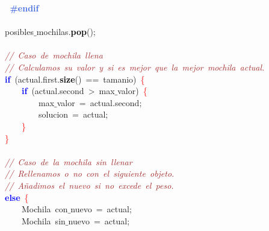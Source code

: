 \mbox{}\textbf{\textcolor{RoyalBlue}{\ \ \ \ \ \ \ \ \#endif}} \\
\mbox{} \\
\mbox{}\ \ \ \ \ \ \ \ posibles$\_$mochilas\textcolor{BrickRed}{.}\textbf{\textcolor{Black}{pop}}\textcolor{BrickRed}{();} \\
\mbox{}\ \ \ \ \ \ \ \  \\
\mbox{}\ \ \ \ \ \ \ \ \textit{\textcolor{Brown}{//\ Caso\ de\ mochila\ llena}} \\
\mbox{}\ \ \ \ \ \ \ \ \textit{\textcolor{Brown}{//\ Calculamos\ su\ valor\ y\ si\ es\ mejor\ que\ la\ mejor\ mochila\ actual.}} \\
\mbox{}\ \ \ \ \ \ \ \ \textbf{\textcolor{Blue}{if}}\ \textcolor{BrickRed}{(}actual\textcolor{BrickRed}{.}first\textcolor{BrickRed}{.}\textbf{\textcolor{Black}{size}}\textcolor{BrickRed}{()}\ \textcolor{BrickRed}{==}\ tamanio\textcolor{BrickRed}{)}\ \textcolor{Red}{\{} \\
\mbox{}\ \ \ \ \ \ \ \ \ \ \ \ \textbf{\textcolor{Blue}{if}}\ \textcolor{BrickRed}{(}actual\textcolor{BrickRed}{.}second\ \textcolor{BrickRed}{\textgreater{}}\ max$\_$valor\textcolor{BrickRed}{)}\ \textcolor{Red}{\{} \\
\mbox{}\ \ \ \ \ \ \ \ \ \ \ \ \ \ \ \ max$\_$valor\ \textcolor{BrickRed}{=}\ actual\textcolor{BrickRed}{.}second\textcolor{BrickRed}{;} \\
\mbox{}\ \ \ \ \ \ \ \ \ \ \ \ \ \ \ \ solucion\ \textcolor{BrickRed}{=}\ actual\textcolor{BrickRed}{;} \\
\mbox{}\ \ \ \ \ \ \ \ \ \ \ \ \textcolor{Red}{\}} \\
\mbox{}\ \ \ \ \ \ \ \ \textcolor{Red}{\}} \\
\mbox{}\ \ \ \ \ \ \ \  \\
\mbox{}\ \ \ \ \ \ \ \ \textit{\textcolor{Brown}{//\ Caso\ de\ la\ mochila\ sin\ llenar}} \\
\mbox{}\ \ \ \ \ \ \ \ \textit{\textcolor{Brown}{//\ Rellenamos\ o\ no\ con\ el\ siguiente\ objeto.}} \\
\mbox{}\ \ \ \ \ \ \ \ \textit{\textcolor{Brown}{//\ Añadimos\ el\ nuevo\ si\ no\ excede\ el\ peso.}} \\
\mbox{}\ \ \ \ \ \ \ \ \textbf{\textcolor{Blue}{else}}\ \textcolor{Red}{\{} \\
\mbox{}\ \ \ \ \ \ \ \ \ \ \ \ \textcolor{TealBlue}{Mochila}\ con$\_$nuevo\ \textcolor{BrickRed}{=}\ actual\textcolor{BrickRed}{;} \\
\mbox{}\ \ \ \ \ \ \ \ \ \ \ \ \textcolor{TealBlue}{Mochila}\ sin$\_$nuevo\ \textcolor{BrickRed}{=}\ actual\textcolor{BrickRed}{;} \\
